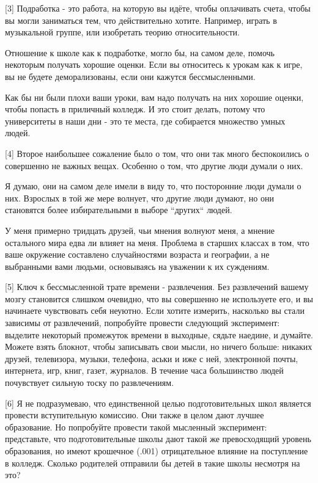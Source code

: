 \documentclass[ebook,12pt,oneside,openany]{memoir}
\begin{document}
[3] Подработка - это работа, на которую вы идёте, чтобы оплачивать
счета, чтобы вы могли заниматься тем, что действительно хотите.
Например, играть в музыкальной группе, или изобретать теорию
относительности. \newline

Отношение к школе как к подработке, могло бы, на самом деле, помочь
некоторым получать хорошие оценки. Если вы относитесь к урокам как к
игре, вы не будете деморализованы, если они кажутся бессмысленными. \newline

Как бы ни были плохи ваши уроки, вам надо получать на них хорошие
оценки, чтобы попасть в приличный колледж. И это стоит делать, потому
что университеты в наши дни - это те места, где собирается множество
умных людей. \newline

[4] Второе наибольшее сожаление было о том, что они так много
беспокоились о совершенно не важных вещах. Особенно о том, что другие
люди думали о них. \newline

Я думаю, они на самом деле имели в виду то, что посторонние люди
думали о них. Взрослых в той же мере волнует, что другие люди думают,
но они становятся более избирательными в выборе ``других`` людей. \newline

У меня примерно тридцать друзей, чьи мнения волнуют меня, а мнение
остального мира едва ли влияет на меня. Проблема в старших классах в
том, что ваше окружение составлено случайностями возраста и географии,
а не выбранными вами людьми, основываясь на уважении к их суждениям. \newline

[5] Ключ к бессмысленной трате времени - развлечения. Без развлечений
вашему мозгу становится слишком очевидно, что вы совершенно не
используете его, и вы начинаете чувствовать себя неуютно. Если хотите
измерить, насколько вы стали зависимы от развлечений, попробуйте
провести следующий эксперимент: выделите некоторый промежуток времени
в выходные, сядьте наедине, и думайте. Можете взять блокнот, чтобы
записывать свои мысли, но ничего больше: никаких друзей, телевизора,
музыки, телефона, аськи и иже с ней, электронной почты, интернета,
игр, книг, газет, журналов. В течение часа большинство людей
почувствует сильную тоску по развлечениям. \newline

[6] Я не подразумеваю, что единственной целью подготовительных школ
является провести вступительную комиссию. Они также в целом дают
лучшее образование. Но попробуйте провести такой мысленный
эксперимент: представьте, что подготовительные школы дают такой же
превосходящий уровень образования, но имеют крошечное (.001)
отрицательное влияние на поступление в колледж. Сколько родителей
отправили бы детей в такие школы несмотря на это? \newline
\end{document}
